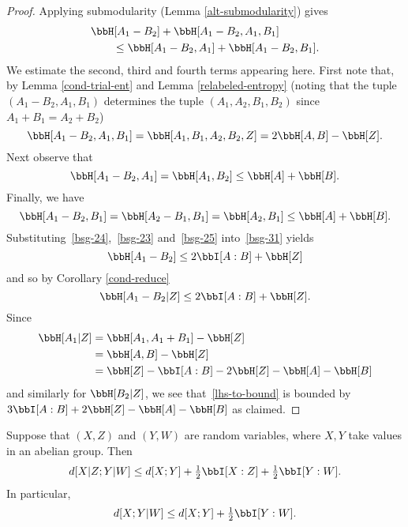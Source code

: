 \begin{proof}
Applying submodularity (Lemma \ref{alt-submodularity}) gives
\begin{equation}\label{bsg-31} \begin{split}
&\bbH[A_1 - B_2] + \bbH[A_1 - B_2, A_1, B_1] \\
&\qquad \leq \bbH[A_1 - B_2, A_1] + \bbH[A_1 - B_2,B_1].
\end{split}\end{equation}
We estimate the second, third and fourth terms appearing here.
First note that, by Lemma \ref{cond-trial-ent} and Lemma \ref{relabeled-entropy} (noting that the tuple $(A_1 - B_2, A_1, B_1)$  determines the tuple $(A_1, A_2, B_1, B_2)$ since $A_1+B_1=A_2+B_2$)
\begin{equation}\label{bsg-24} \bbH[A_1 - B_2, A_1, B_1] = \bbH[A_1, B_1, A_2, B_2,Z] = 2\bbH[A,B] - \bbH[Z].\end{equation}
Next observe that
\begin{equation}\label{bsg-23} \bbH[A_1 - B_2, A_1] = \bbH[A_1, B_2] \leq \bbH[A] + \bbH[B].
\end{equation}
Finally, we have
\begin{equation}\label{bsg-25} \bbH[A_1 - B_2, B_1] = \bbH[A_2 - B_1, B_1] = \bbH[A_2, B_1] \leq \bbH[A] + \bbH[B].\end{equation}
Substituting~\eqref{bsg-24},~\eqref{bsg-23} and~\eqref{bsg-25} into~\eqref{bsg-31} yields
\[ \bbH[A_1 - B_2] \leq 2 \bbI[A:B] + \bbH[Z]\] and so by Corollary \ref{cond-reduce}
\[\bbH[A_1 - B_2 | Z]  \leq 2 \bbI[A:B] + \bbH[Z].\]
Since
\begin{align*} \bbH[A_1 | Z] & = \bbH[A_1, A_1 + B_1] - \bbH[Z] \\ & = \bbH[A,B] - \bbH[Z] \\ & = \bbH[Z] -  \bbI[A:B] - 2 \bbH[Z]- \bbH[A]-\bbH[B]\end{align*}
and similarly for $\bbH[B_2 | Z]$, we see that~\eqref{lhs-to-bound} is bounded by
$3 \bbI[A:B] + 2\bbH[Z]-\bbH[A]-\bbH[B]$ as claimed.
\end{proof}


\begin{lemma}\label{cond-dist-fact}
  \leanok
  Suppose that $(X, Z)$ and $(Y, W)$ are random variables, where $X, Y$ take values in an abelian group. Then
  \[    d[X  | Z;Y | W] \leq d[X; Y] + \tfrac{1}{2}  \bbI[X : Z] + \tfrac{1}{2}  \bbI[Y : W].\]
  In particular,
  \[    d[X ;Y | W] \leq d[X; Y] + \tfrac{1}{2}  \bbI[Y : W].\]
\end{lemma}

